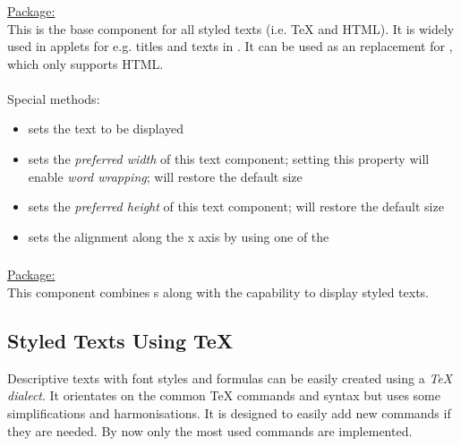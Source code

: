 \subsubsection{}

  \underline{Package:} \\
  This is the base component for all styled texts (i.e. TeX and HTML). 
  It is widely used in applets for e.g. titles and texts in \cps.
  It can be used as an replacement for , which only supports HTML.\\
\\
Special methods:
  \begin{itemize}
    \item \textbf{} sets the text to be displayed
    \item \textbf{} sets the \textit{preferred width} of this text component; 
          setting this property will enable \textit{word wrapping};  will restore the default size
    \item \textbf{} sets the \textit{preferred height} of this text component; 
           will restore the default size
    \item \textbf{} sets the alignment along the x axis by using 
          one of the 
  \end{itemize}

\subsubsection{}

  \underline{Package:} \\
  This component combines s along with the capability to display styled texts.



\subsection{Styled Texts Using TeX}

Descriptive texts with font styles and formulas can be easily created using a \textit{TeX dialect}.
It orientates on the common TeX commands and syntax but uses some simplifications and harmonisations.
It is designed to easily add new commands if they are needed. By now only the most used commands are
implemented.


